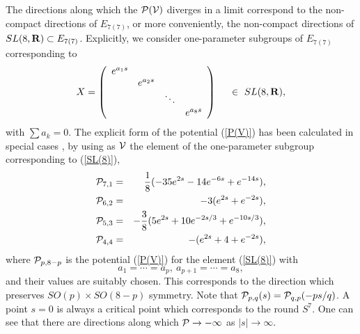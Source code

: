 \documentclass[a4paper,a4paper]{article}
\begin{document}
The directions along which the ${\cal P(V)}$ diverges in a limit correspond to the non-compact directions of 
$E_{7(7)}$, or more conveniently, the non-compact directions of $SL(8,{\bf R})\subset E_{7(7)}$. 
Explicitly, we consider one-parameter subgroups of $E_{7(7)}$ corresponding to 
\begin{equation}
X = \left(
\begin{array}{cccc}
e^{a_1s} & & & \\ & e^{a_2s} & & \\ & & \ddots & \\ & & & e^{a_8s}
   \label{SL(8)}
\end{array}
\right) \hspace{5mm} \in \ SL(8,{\bf R}), 
\end{equation}
with $\sum a_k=0$. 
The explicit form of the potential (\ref{P(V)}) has been calculated in special cases \cite{explicitP}, 
by using as ${\cal V}$ the element of the one-parameter subgroup corresponding to (\ref{SL(8)}), 
\begin{eqnarray}
{\cal P}_{7,1} &=& \frac18(-35e^{2s}-14e^{-6s}+e^{-14s}), \\
{\cal P}_{6,2} &=& -3(e^{2s}+e^{-2s}), 
      \label{62}  \\
{\cal P}_{5,3} &=& -\frac38(5e^{2s}+10e^{-2s/3}+e^{-10s/3}), \\
{\cal P}_{4,4} &=& -(e^{2s}+4+e^{-2s}), 
\end{eqnarray}
where ${\cal P}_{p,8-p}$ is the potential (\ref{P(V)}) for the element (\ref{SL(8)}) with 
\begin{equation}
a_1=\cdots=a_p, \ a_{p+1}=\cdots=a_8,
\end{equation}
and their values are suitably chosen. 
This corresponds to the direction which preserves $SO(p)\times SO(8-p)$ symmetry. 
Note that ${\cal P}_{p,q}(s)={\cal P}_{q,p}(-ps/q)$. 
A point $s=0$ is always a critical point which corresponds to the round $S^7$. 
One can see that there are directions along which ${\cal P}\to-\infty$ as $|s|\to\infty$. 

\vspace{3mm}
\end{document}
